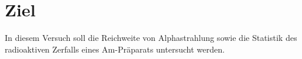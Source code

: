 \section{Ziel}
\label{sec:Ziel}

In diesem Versuch soll die Reichweite von Alphastrahlung sowie die Statistik des radioaktiven
Zerfalls eines Am-Präparats untersucht werden.